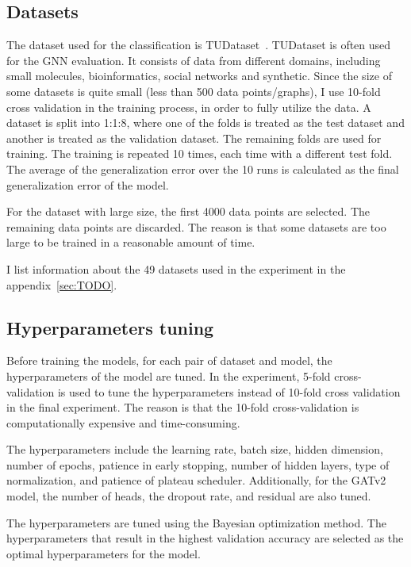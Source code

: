 \subsection{Datasets}\label{sec:datasets}
The dataset used for the classification is TUDataset~\cite{morris2020tudataset}. TUDataset is often used for the GNN evaluation. It consists of data from different domains, including small molecules, bioinformatics, social networks and synthetic. Since the size of some datasets is quite small (less than 500 data points/graphs), I use 10-fold cross validation in the training process, in order to fully utilize the data. A dataset is split into 1:1:8, where one of the folds is treated as the test dataset and another is treated as the validation dataset. The remaining folds are used for training. The training is repeated 10 times, each time with a different test fold. The average of the generalization error over the 10 runs is calculated as the final generalization error of the model.

For the dataset with large size, the first 4000 data points are selected. The remaining data points are discarded. The reason is that some datasets are too large to be trained in a reasonable amount of time.

I list information about the 49 datasets used in the experiment in the appendix~\ref{sec:TODO}.

\subsection{Hyperparameters tuning}\label{sec:hyperparameters tuning}
Before training the models, for each pair of dataset and model, the hyperparameters of the model are tuned. In the experiment, 5-fold cross-validation is used to tune the hyperparameters instead of 10-fold cross validation in the final experiment. The reason is that the 10-fold cross-validation is computationally expensive and time-consuming. 

The hyperparameters include the learning rate, batch size, hidden dimension, number of epochs, patience in early stopping, number of hidden layers, type of normalization, and patience of plateau scheduler. Additionally, for the GATv2 model, the number of heads, the dropout rate, and residual are also tuned.

The hyperparameters are tuned using the Bayesian optimization method\cite{frazier2018tutorial}. The hyperparameters that result in the highest validation accuracy are selected as the optimal hyperparameters for the model. 


